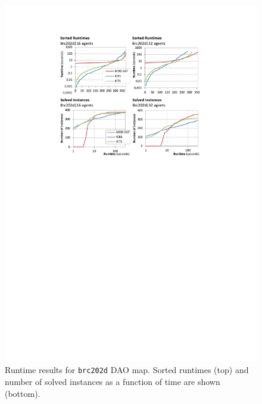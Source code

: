 \documentclass[jair,oneside,11pt]{article}
\begin{document}
\begin{figure}[h]
\centering
\includegraphics[trim={2.5cm 17.0cm 2.5cm 2.5cm},clip,width=1.0\textwidth]{expr_brc202_sorted.pdf}
\vspace{-0.6cm}\caption{Runtime results for \texttt{brc202d} DAO map. Sorted runtimes (top) and number of solved instances as a function of time are shown (bottom).}
\label{figure-brc202-sorted}
\end{figure}
\end{document}
